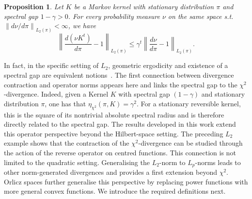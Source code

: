 \documentclass[11pt]{article}
\theoremstyle{plain}
\newtheorem{proposition}{Proposition}
\theoremstyle{remark}
\begin{document}
    \begin{proposition}\label{prof:l2GeometricErgodicity}
        Let $K$ be a Markov kernel with stationary distribution $\pi$ and spectral gap $1-\gamma>0$. For every probability measure $\nu$ on the same space s.t.\ $\left\lVert d\nu/d\pi \right\rVert_{L_2(\pi)}<\infty$, we have %
          \begin{equation}
        \left\lVert \frac{d(\nu K^t)}{d\pi}-1 \right\rVert_{L_2(\pi)} \leq \gamma^t \left\lVert \frac{d\nu}{d\pi}-1\right\rVert_{L_2(\pi)}.
    \end{equation}
    \end{proposition} 
    In fact, in the specific setting of $L_2$, geometric ergodicity and %
    existence of a spectral gap are equivalent notions~\cite[Proposition 3.13]{mcmcThesis}.
    The first connection between divergence contraction and operator norms appears here and links the spectral gap to the $\chi^2$-divergence. Indeed, given a Kernel $K$ with spectral gap $(1-\gamma)$ and stationary distribution $\pi$, one has that 
    $
    \eta_{\chi^2}(\pi, K) = \gamma^2.$
    For a stationary reversible kernel, this is the square of its nontrivial absolute spectral radius and is therefore directly related to the spectral gap. The results developed in this work extend this operator perspective beyond the Hilbert-space setting. The preceding $L_2$ example shows that the contraction of the $\chi^2$-divergence can be studied through the action of the reverse operator on centred functions. This connection is not limited to the quadratic setting. Generalising the $L_2$-norm to $L_p$-norms leads to other norm-generated divergences and provides a first extension beyond $\chi^2$. Orlicz spaces further generalise this perspective by replacing power functions with more general convex functions. We introduce the required definitions next.
\end{document}
